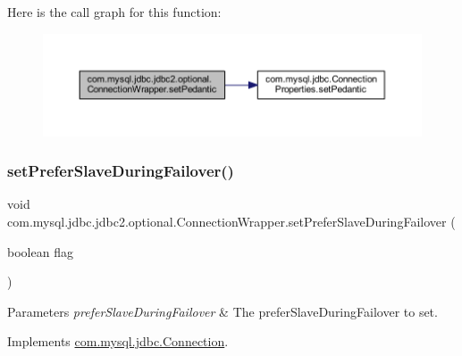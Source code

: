 Here is the call graph for this function\+:
\nopagebreak
\begin{figure}[H]
\begin{center}
\leavevmode
\includegraphics[width=350pt]{classcom_1_1mysql_1_1jdbc_1_1jdbc2_1_1optional_1_1_connection_wrapper_a1c2af9306775ec3517e4aee8de864380_cgraph}
\end{center}
\end{figure}
\mbox{\label{classcom_1_1mysql_1_1jdbc_1_1jdbc2_1_1optional_1_1_connection_wrapper_a41e30138708f151589417be4f59e8c59}} 
\subsubsection{\texorpdfstring{set\+Prefer\+Slave\+During\+Failover()}{setPreferSlaveDuringFailover()}}
{\footnotesize\ttfamily void com.\+mysql.\+jdbc.\+jdbc2.\+optional.\+Connection\+Wrapper.\+set\+Prefer\+Slave\+During\+Failover (\begin{DoxyParamCaption}\item[{boolean}]{flag }\end{DoxyParamCaption})}


\begin{DoxyParams}{Parameters}
{\em prefer\+Slave\+During\+Failover} & The prefer\+Slave\+During\+Failover to set. \\
\hline
\end{DoxyParams}


Implements \mbox{\hyperlink{interfacecom_1_1mysql_1_1jdbc_1_1_connection_af8c0ed78ccafd6088266b19481b85ce6}{com.\+mysql.\+jdbc.\+Connection}}.

